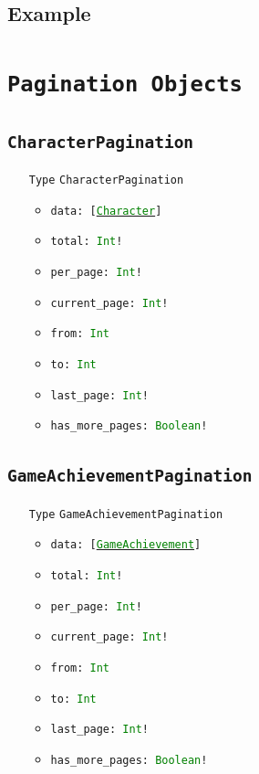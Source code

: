 \documentclass[10pt, a4paper]{memoir}
\numberwithin{equation}{section}
\theoremstyle{plain}
\theoremstyle{defp}
\theoremstyle{dotless}
\theoremstyle{definition}
\theoremstyle{dotless}
\theoremstyle{dotless}
\theoremstyle{defp}
\theoremstyle{defp}
\theoremstyle{be}          %
\theoremstyle{defp}
\newcommand\ttt[1]{\texttt{#1}}
\newcommand\type[1]{\ttt{\textcolor{green}{#1}}}
\begin{document}
\subsection{Example}

\newpage


\section{\ttt{Pagination Objects}}

\subsection{\ttt{CharacterPagination}}\label{sec:characterpagination}

\begin{itemize}[noitemsep,topsep=1pt]
\item[\ttt{Type}] \ttt{CharacterPagination}
\begin{itemize}[itemsep=1pt,topsep=1pt]
\item \ttt{data: [\hyperref[sec:Character]{\type{Character}}]}
\item \ttt{total: \type{Int}!}
\item \ttt{per\_page: \type{Int}!}
\item \ttt{current\_page: \type{Int}!}
\item \ttt{from: \type{Int}}
\item \ttt{to: \type{Int}}
\item \ttt{last\_page: \type{Int}!}
\item \ttt{has\_more\_pages: \type{Boolean}!}
\end{itemize}
\end{itemize}

\subsection{\ttt{GameAchievementPagination}}\label{sec:gameachievementpagination}

\begin{itemize}[noitemsep,topsep=1pt]
\item[\ttt{Type}] \ttt{GameAchievementPagination}
\begin{itemize}[itemsep=1pt,topsep=1pt]
\item \ttt{data: [\hyperref[sec:GameAchievement]{\type{GameAchievement}}]}
\item \ttt{total: \type{Int}!}
\item \ttt{per\_page: \type{Int}!}
\item \ttt{current\_page: \type{Int}!}
\item \ttt{from: \type{Int}}
\item \ttt{to: \type{Int}}
\item \ttt{last\_page: \type{Int}!}
\item \ttt{has\_more\_pages: \type{Boolean}!}
\end{itemize}
\end{itemize}
\end{document}
